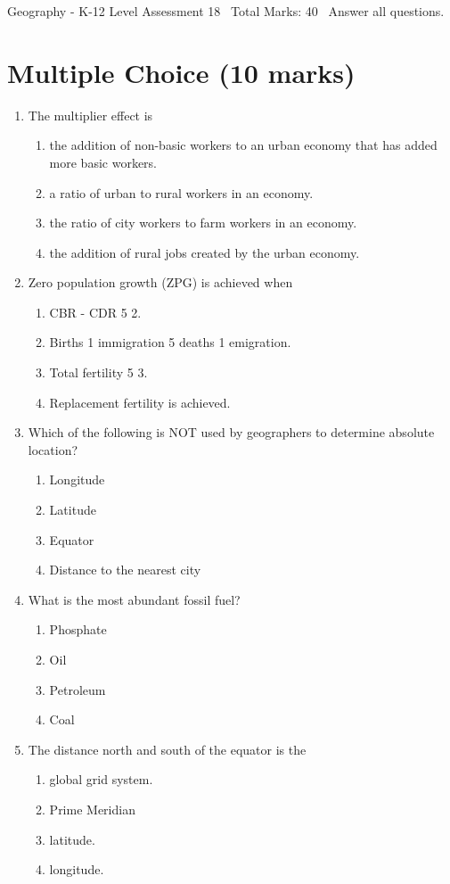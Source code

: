 \documentclass[12pt]{article}
\begin{document}
\begin{center}
Geography - K-12 Level Assessment 18 \
Total Marks: 40 \
Answer all questions.
\end{center}

\section*{Multiple Choice (10 marks)}
\begin{enumerate}[label=\arabic*.]
\item The multiplier effect is
\begin{enumerate}[label=(\alph*)]
    \item the addition of non-basic workers to an urban economy that has added more basic workers.
    \item a ratio of urban to rural workers in an economy.
    \item the ratio of city workers to farm workers in an economy.
    \item the addition of rural jobs created by the urban economy.
\end{enumerate}
\item Zero population growth (ZPG) is achieved when
\begin{enumerate}[label=(\alph*)]
    \item CBR - CDR 5 2.
    \item Births 1 immigration 5 deaths 1 emigration.
    \item Total fertility 5 3.
    \item Replacement fertility is achieved.
\end{enumerate}
\item Which of the following is NOT used by geographers to determine absolute location?
\begin{enumerate}[label=(\alph*)]
    \item Longitude
    \item Latitude
    \item Equator
    \item Distance to the nearest city
\end{enumerate}
\item What is the most abundant fossil fuel?
\begin{enumerate}[label=(\alph*)]
    \item Phosphate
    \item Oil
    \item Petroleum
    \item Coal
\end{enumerate}
\item The distance north and south of the equator is the
\begin{enumerate}[label=(\alph*)]
    \item global grid system.
    \item Prime Meridian
    \item latitude.
    \item longitude.
\end{enumerate}
\end{enumerate}
\end{document}
